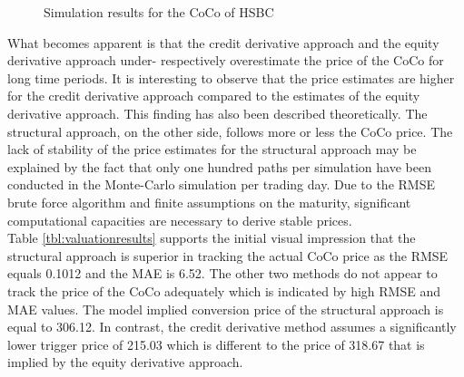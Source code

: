 \begin{figure}[H]
\centering
{}
\caption[Simulation results for the CoCo of HSBC]{Simulation results for the CoCo of HSBC}
\label{fig:valuation}
\end{figure}

What becomes apparent is that the credit derivative approach and the equity derivative approach under- respectively overestimate the price of the CoCo for long time periods. It is interesting to observe that the price estimates are higher for the credit derivative approach compared to the estimates of the equity derivative approach. This finding has also been described theoretically. The structural approach, on the other side, follows more or less the CoCo price. The lack of stability of the price estimates for the structural approach may be explained by the fact that only one hundred paths per simulation have been conducted in the Monte-Carlo simulation per trading day. Due to the RMSE brute force algorithm and finite assumptions on the maturity, significant computational capacities are necessary to derive stable prices. \\

Table \ref{tbl:valuationresults} supports the initial visual impression that the structural approach is superior in tracking the actual CoCo price as the RMSE equals 0.1012 and the MAE is 6.52. The other two methods do not appear to track the price of the CoCo adequately which is indicated by high RMSE and MAE values. The model implied conversion price of the structural approach is equal to 306.12. In contrast, the credit derivative method assumes a significantly lower trigger price of 215.03 which is different to the price of 318.67 that is implied by the equity derivative approach.

